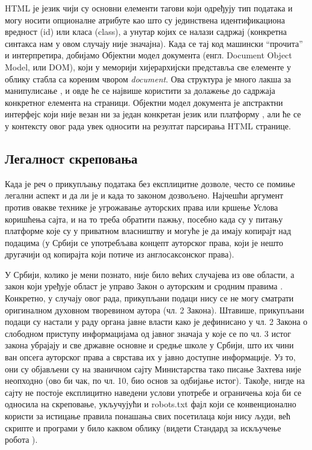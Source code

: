 HTML је језик чији су основни елементи тагови који одређују тип података и могу носити опционалне атрибуте као што су јединствена идентификациона вредност (id) или класа (class), а унутар којих се налази садржај (конкретна синтакса нам у овом случају није значајна). Када се тај код машински \enquote{прочита} и интерпретира, добијамо Објектни модел документа (енгл. Document Object Model, или DOM), који у меморији хијерархијски представља све елементе у облику стабла са кореним чвором \emph{document}. Ова структура је много лакша за манипулисање \citep{gupta2003dom}, и овде ће се највише користити за долажење до садржаја конкретног елемента на страници. Објектни модел документа је апстрактни интерфејс који није везан ни за један конкретан језик или платформу \citep{w3domdef}, али ће се у контексту овог рада увек односити на резултат парсирања HTML странице.

\subsection{Легалност скреповања}

Када је реч о прикупљању података без експлицитне дозволе, често се помиње легални аспект и да ли је и када то законом дозвољено. Најчешћи аргумент против овакве технике је угрожавање ауторских права или кршење Услова коришћења сајта, и на то треба обратити пажњу, посебно када су у питању платформе које су у приватном власништву и могуће је да имају копирајт над подацима (у Србији се употребљава концепт ауторског права, који је нешто другачији од копирајта који потиче из англосаксонског права). 

У Србији, колико је мени познато, није било већих случајева из ове области, а закон који уређује област је управо Закон о ауторским и сродним правима \citep{autorskaprava}. Конкретно, у случају овог рада, прикупљани подаци нису се не могу сматрати оригиналном духовном творевином аутора (чл. 2 Закона). Штавише, прикупљани подаци су настали у раду органа јавне власти како је дефинисано у чл. 2 Закона о слободном приступу информацијама од јавног значаја \citep{zospi} у које се по чл. 3 истог закона убрајају и све државне основне и средње школе у Србији, што их чини ван опсега ауторског права а сврстава их у јавно доступне информације. Уз то, они су објављени су на званичном сајту Министарства тако писање Захтева није неопходно (ово би чак, по чл. 10, био основ за одбијање истог). Такође, нигде на сајту не постоје експлицитно наведени услови употребе и ограничења која би се односила на скреповање, укључујући и robots.txt фајл који се конвенционално користи за истицање правила понашања свих посетилаца који нису људи, већ скрипте и програми у било каквом облику (видети Стандард за искључење робота \citep{robotstxt}).

